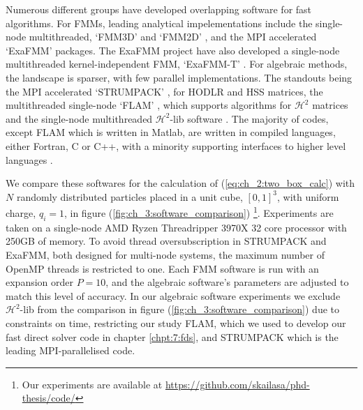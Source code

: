 Numerous different groups have developed overlapping software for fast algorithms. For FMMs, leading analytical impelementations include the single-node multithreaded, `FMM3D' and `FMM2D' \cite{fmm3d, fmm2d}, and the MPI accelerated  `ExaFMM' \cite{exafmm} packages. The ExaFMM project have also developed a single-node multithreaded kernel-independent FMM, `ExaFMM-T' \cite{wang2021exafmm}. For algebraic methods, the landscape is sparser, with few parallel implementations. The standouts being the MPI accelerated `STRUMPACK' \cite{ghyselsstrumpack}, for HODLR and HSS matrices, the multithreaded single-node `FLAM' \cite{ho2020flam}, which supports algorithms for $\mathcal{H}^2$ matrices and the single-node multithreaded $\mathcal{H}^2$-lib software \cite{h2lib2016github}. The majority of codes, except FLAM which is written in Matlab, are written in compiled languages, either Fortran, C or C++, with a minority supporting interfaces to higher level languages \cite{wang2021exafmm,fmm3d}.

We compare these softwares for the calculation of (\ref{eq:ch_2:two_box_calc}) with $N$ randomly distributed particles placed in a unit cube, $[0, 1]^3$, with uniform charge, $q_i=1$, in figure (\ref{fig:ch_3:software_comparison}) \footnote{Our experiments are available at \url{https://github.com/skailasa/phd-thesis/code/}}. Experiments are taken on a single-node AMD Ryzen Threadripper 3970X 32 core processor with 250GB of memory. To avoid thread oversubscription in STRUMPACK and ExaFMM, both designed for multi-node systems, the maximum number of OpenMP threads is restricted to one. Each FMM software is run with an expansion order $P=10$, and the algebraic software's parameters are adjusted to match this level of accuracy. In our algebraic software experiments we exclude $\mathcal{H}^2$-lib from the comparison in figure (\ref{fig:ch_3:software_comparison}) due to constraints on time, restricting our study FLAM, which we used to develop our fast direct solver code in chapter \ref{chpt:7:fds}, and STRUMPACK which is the leading MPI-parallelised code.

